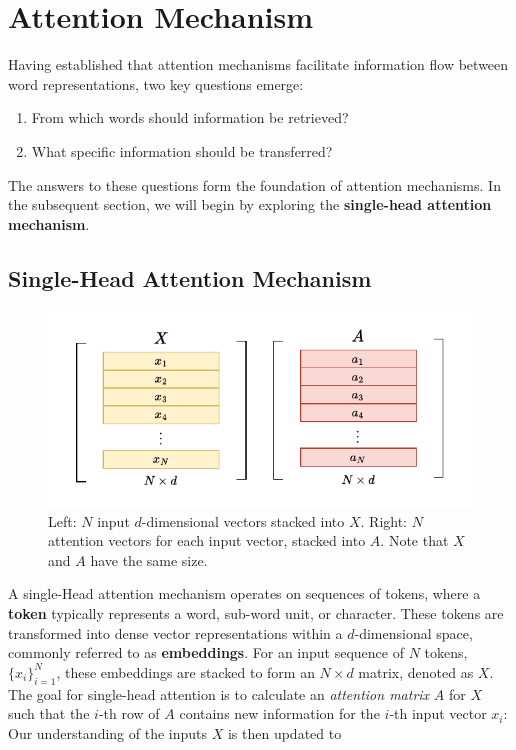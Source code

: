 \section{Attention Mechanism}

Having established that attention mechanisms facilitate information flow between word representations, two key questions emerge:

\begin{enumerate}
    \item From which words should information be retrieved?
    \item What specific information should be transferred?
\end{enumerate}

The answers to these questions form the foundation of attention mechanisms. In the subsequent section, we will begin by exploring the \textbf{single-head attention mechanism}.

\subsection{Single-Head Attention Mechanism}

\begin{figure}
    \centering
    \includegraphics[width=1\linewidth]{fig/X_A.pdf}
    \caption{Left: $N$ input $d$-dimensional vectors stacked into $X$. Right: $N$ attention vectors for each input vector, stacked into $A$. Note that $X$ and $A$ have the same size.}
    \label{fig:X}
\end{figure}

A single-Head attention mechanism operates on sequences of tokens, where a \textbf{token} typically represents a word, sub-word unit, or character. These tokens are transformed into dense vector representations within a $d$-dimensional space, commonly referred to as \textbf{embeddings}. For an input sequence of $N$ tokens, $\{x_i\}_{i=1}^N$, these embeddings are stacked to form an $N \times d$ matrix, denoted as $X$. The goal for single-head attention is to calculate an \textit{attention matrix} $A$ for $X$ such that the $i$-th row of $A$ contains new information for the $i$-th input vector $x_i$: Our understanding of the inputs $X$ is then updated to

